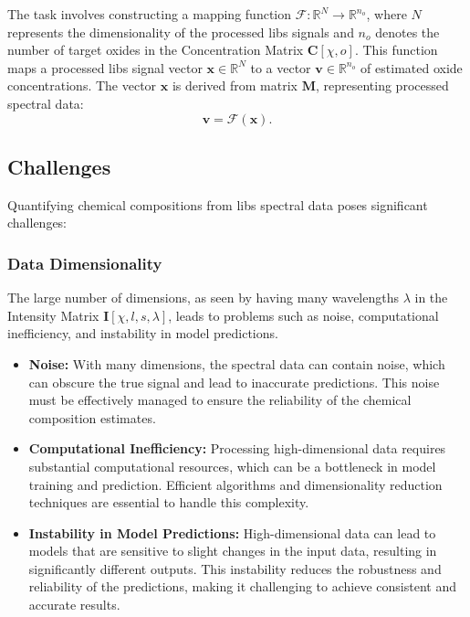 The task involves constructing a mapping function $\mathcal{F}: \mathbb{R}^N \rightarrow \mathbb{R}^{n_o}$, where $N$ represents the dimensionality of the processed \gls{libs} signals and $n_o$ denotes the number of target oxides in the Concentration Matrix $\mathbf{C}[\chi, o]$.
This function maps a processed \gls{libs} signal vector $\mathbf{x} \in \mathbb{R}^N$ to a vector $\mathbf{v} \in \mathbb{R}^{n_o}$ of estimated oxide concentrations.
The vector $\mathbf{x}$ is derived from matrix $\mathbf{M}$, representing processed spectral data:
\[
\mathbf{v} = \mathcal{F}(\mathbf{x}).
\]

\subsection{Challenges}
Quantifying chemical compositions from \gls{libs} spectral data poses significant challenges:

\subsubsection{Data Dimensionality}
The large number of dimensions, as seen by having many wavelengths $\lambda$ in the Intensity Matrix $\mathbf{I}[\chi, l, s, \lambda]$, leads to problems such as noise, computational inefficiency, and instability in model predictions.
\begin{itemize}
    \item \textbf{Noise:} With many dimensions, the spectral data can contain noise, which can obscure the true signal and lead to inaccurate predictions. This noise must be effectively managed to ensure the reliability of the chemical composition estimates.
    
    \item \textbf{Computational Inefficiency:} Processing high-dimensional data requires substantial computational resources, which can be a bottleneck in model training and prediction. Efficient algorithms and dimensionality reduction techniques are essential to handle this complexity.

    \item \textbf{Instability in Model Predictions:} High-dimensional data can lead to models that are sensitive to slight changes in the input data, resulting in significantly different outputs. This instability reduces the robustness and reliability of the predictions, making it challenging to achieve consistent and accurate results.
\end{itemize}

